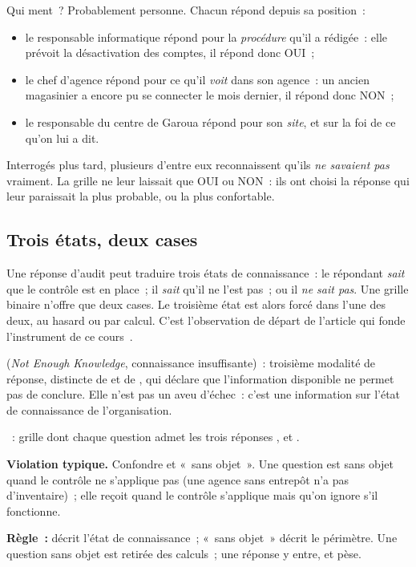 Qui ment~? Probablement personne. Chacun répond depuis sa position~:
\begin{itemize}
    \item le responsable informatique répond pour la \emph{procédure} qu'il a
          rédigée~: elle prévoit la désactivation des comptes, il répond donc
          OUI~;
    \item le chef d'agence répond pour ce qu'il \emph{voit} dans son
          agence~: un ancien magasinier a encore pu se connecter le mois
          dernier, il répond donc NON~;
    \item le responsable du centre de Garoua répond pour son \emph{site}, et
          sur la foi de ce qu'on lui a dit.
\end{itemize}
Interrogés plus tard, plusieurs d'entre eux reconnaissent qu'ils \emph{ne
savaient pas} vraiment. La grille ne leur laissait que OUI ou NON~: ils ont
choisi la réponse qui leur paraissait la plus probable, ou la plus
confortable.

\subsection{Trois états, deux cases}

Une réponse d'audit peut traduire trois états de connaissance~: le
répondant \emph{sait} que le contrôle est en place~; il \emph{sait} qu'il ne
l'est pas~; ou il \emph{ne sait pas}. Une grille binaire n'offre que deux
cases. Le troisième état est alors forcé dans l'une des deux, au hasard ou
par calcul. C'est l'observation de départ de l'article qui fonde
l'instrument de ce cours~\cite{minka2026nek}.

\begin{boxdef}
 (\textit{Not Enough Knowledge},
connaissance insuffisante)~: troisième modalité de réponse, distincte de
\OUI{} et de \NON{}, qui déclare que l'information disponible ne permet pas
de conclure. Elle n'est pas un aveu d'échec~: c'est une information sur
l'état de connaissance de l'organisation.

\medskip
{}~: grille
dont chaque question admet les trois réponses \OUI{}, \NON{} et \NEK{}.
\end{boxdef}

\begin{boxalert}
\textbf{Violation typique.} Confondre \NEK{} et «~sans objet~». Une question
est sans objet quand le contrôle ne s'applique pas (une agence sans
entrepôt n'a pas d'inventaire)~; elle reçoit \NEK{} quand le contrôle
s'applique mais qu'on ignore s'il fonctionne.

\smallskip
\textbf{Règle~:} \NEK{} décrit l'état de connaissance~; «~sans objet~»
décrit le périmètre. Une question sans objet est retirée des calculs~; une
réponse \NEK{} y entre, et pèse.
\end{boxalert}


